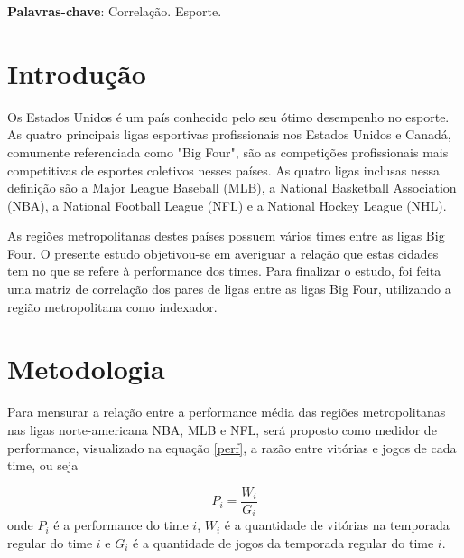 \documentclass[12pt,oneside,a4paper,chapter=TITLE,english,brazil,sumario=abnt-6027-2012]{abntex2}
\begin{document}
	
\clearpage\maketitle
\thispagestyle{empty}
\setlength{\absparsep}{18pt} 
\begin{resumo}
	
	
	\noindent
	
	\textbf{Palavras-chave}:  Correlação. Esporte.   
\end{resumo}


	
	\tableofcontents*
	\cleardoublepage
	
	
	
	\textual 
	\pagestyle{simple}
	
\chapter{Introdução}

	Os Estados Unidos é um país conhecido pelo seu ótimo desempenho no esporte. As quatro principais ligas esportivas profissionais nos Estados Unidos e Canadá, comumente referenciada como "Big Four", são as competições profissionais mais competitivas de esportes coletivos nesses países. As quatro ligas inclusas nessa definição são a Major League Baseball (MLB), a National Basketball Association (NBA), a National Football League (NFL) e a National Hockey League (NHL). 
	
	As regiões metropolitanas destes países possuem vários times entre as ligas Big Four. O presente estudo objetivou-se em averiguar a relação que estas cidades tem no que se refere à performance dos times. Para finalizar o estudo, foi feita uma matriz de correlação dos pares de ligas entre as ligas Big Four, utilizando a região metropolitana como indexador.
	


\chapter{Metodologia}

	Para mensurar a relação entre a performance média das regiões metropolitanas nas ligas norte-americana NBA, MLB e NFL, será proposto como medidor de performance, visualizado na equação \ref{perf}, a razão entre vitórias e jogos de cada time, ou seja
	
	\begin{equation}
		P_i = \frac{W_i}{G_i}
		\label{perf}
	\end{equation}
	onde $P_i$ é a performance do time $i$, $W_i$ é a quantidade de vitórias na temporada regular do time $i$ e $G_i$ é a quantidade de jogos da temporada regular do time $i$.
	
\end{document}
